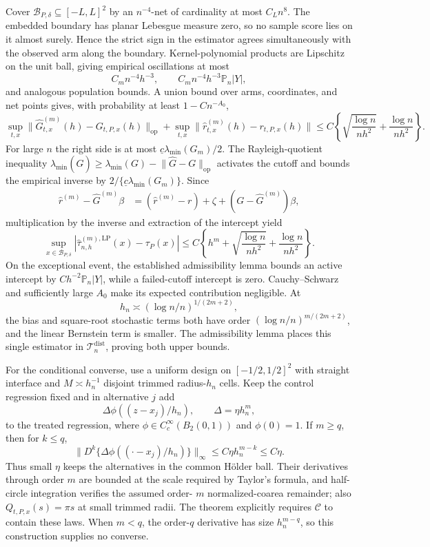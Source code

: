 Cover \(\mathcal B_{P,\delta}\subseteq[-L,L]^2\) by an \(n^{-4}\)-net of
cardinality at most \(C_Ln^8\).  The embedded boundary has planar Lebesgue
measure zero, so no sample score lies on it almost surely.  Hence the strict sign
in the estimator agrees simultaneously with the observed arm along the
boundary.  Kernel-polynomial products are Lipschitz on the unit ball, giving
empirical oscillations at most
\[
 C_mn^{-4}h^{-3},
 \qquad C_mn^{-4}h^{-3}\mathbb P_n|Y|,
\]
and analogous population bounds.  A union bound over arms, coordinates, and
net points gives, with probability at least \(1-Cn^{-A_0}\),
\[
 \sup_{t,x}\lVert\widehat G^{(m)}_{t,x}(h)-G_{t,P,x}(h)\rVert_{\mathrm{op}}
 +\sup_{t,x}\lVert\widehat r^{(m)}_{t,x}(h)-r_{t,P,x}(h)\rVert
 \leq C\left\{\sqrt{\frac{\log n}{nh^2}}+
 \frac{\log n}{nh^2}\right\}.
\]
For large \(n\) the right side is at most
\(\underline c\lambda_{\min}(G_m)/2\).  The Rayleigh-quotient inequality
\(\lambda_{\min}(\widehat G)\geq
\lambda_{\min}(G)-\lVert\widehat G-G\rVert_{\mathrm{op}}\) activates the
cutoff and bounds the empirical inverse by
\(2/\{\underline c\lambda_{\min}(G_m)\}\).  Since
\[
\begin{aligned}
 \widehat r^{(m)}-\widehat G^{(m)}\beta
 &=(\widehat r^{(m)}-r)+\zeta+(G-\widehat G^{(m)})\beta,
\end{aligned}
\]
multiplication by the inverse and extraction of the intercept yield
\[
 \sup_{x\in\mathcal B_{P,\delta}}
 |\widehat\tau^{(m),\mathrm{LP}}_{n,h}(x)-\tau_P(x)|
 \leq C\left\{h^m+\sqrt{\frac{\log n}{nh^2}}+
 \frac{\log n}{nh^2}\right\}.
\]
On the exceptional event, the established admissibility lemma bounds an active
intercept by \(Ch^{-2}\mathbb P_n|Y|\), while a failed-cutoff intercept is zero.
Cauchy--Schwarz and sufficiently large \(A_0\) make its expected contribution
negligible.  At
\[
 h_n\asymp(\log n/n)^{1/(2m+2)},
\]
the bias and square-root stochastic terms both have order
\((\log n/n)^{m/(2m+2)}\), and the linear Bernstein term is smaller.  The
admissibility lemma places this single estimator in
\(\mathcal T_n^{\mathrm{dist}}\), proving both upper bounds.

For the conditional converse, use a uniform design on
\([-1/2,1/2]^2\) with straight interface and
\(M\asymp h_n^{-1}\) disjoint trimmed radius-\(h_n\) cells.  Keep the control
regression fixed and in alternative \(j\) add
\[
 \Delta\phi((z-x_j)/h_n),\qquad \Delta=\eta h_n^m,
\]
to the treated regression, where
\(\phi\in C_c^\infty(B_2(0,1))\) and \(\phi(0)=1\).  If \(m\geq q\), then
for \(k\leq q\),
\[
 \lVert D^k\{\Delta\phi((\cdot-x_j)/h_n)\}\rVert_\infty
 \leq C\eta h_n^{m-k}\leq C\eta.
\]
Thus small \(\eta\) keeps the alternatives in the common H\"older ball.
Their derivatives through order \(m\) are bounded at the scale required by
Taylor's formula, and half-circle integration verifies the assumed order-
\(m\) normalized-coarea remainder; also \(Q_{t,P,x}(s)=\pi s\) at small
trimmed radii.  The theorem explicitly requires \(\mathcal C\) to contain
these laws.  When \(m<q\), the order-\(q\) derivative has size
\(h_n^{m-q}\), so this construction supplies no converse.


